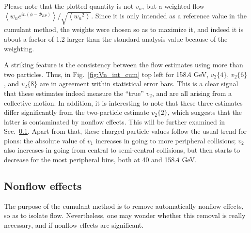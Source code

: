 \documentclass[aps,prc,superscriptaddress,showpacs,floatfix,nofootinbib]{revtex4}
\newcommand{\mean}[1]{\left\langle #1 \right\rangle}
\begin{document}
Please note that the plotted quantity is not $v_n$, but a weighted
flow $\mean{w_n e^{in(\phi-\Phi_{RP})}} / \sqrt{\mean{{w_n}^2}}$.
Since it is only intended as a reference value in the cumulant method,
the weights were chosen so as to maximize it, and indeed it is about a
factor of 1.2 larger than the standard analysis value because of the
weighting.

A striking feature is the consistency between the flow estimates using
more than two particles.  Thus, in Fig.~\ref{fig:Vn_int_cum} top left
for 158$A$ GeV, $v_2\{4\}$, $v_2\{6\}$, and $v_2\{8\}$ are in
agreement within statistical error bars.  This is a clear signal that
these estimates indeed measure the ``true'' $v_2$, and are all arising
from a collective motion.  In addition, it is interesting to note that
these three estimates differ significantly from the two-particle
estimate $v_2\{2\}$, which suggests that the latter is contaminated by
nonflow effects.  This will be further examined in
Sec.~\ref{s:nonflow}.  Apart from that, these charged particle values
follow the usual trend for pions: the absolute value of $v_1$
increases in going to more peripheral collisions; $v_2$ also increases
in going from central to semi-central collisions, but then starts to
decrease for the most peripheral bins, both at 40 and 158$A$ GeV.


\subsection{Nonflow effects}
\label{s:nonflow}

The purpose of the cumulant method is to remove automatically nonflow
effects, so as to isolate flow. Nevertheless, one may wonder whether
this removal is really necessary, and if nonflow effects are significant.
\end{document}
